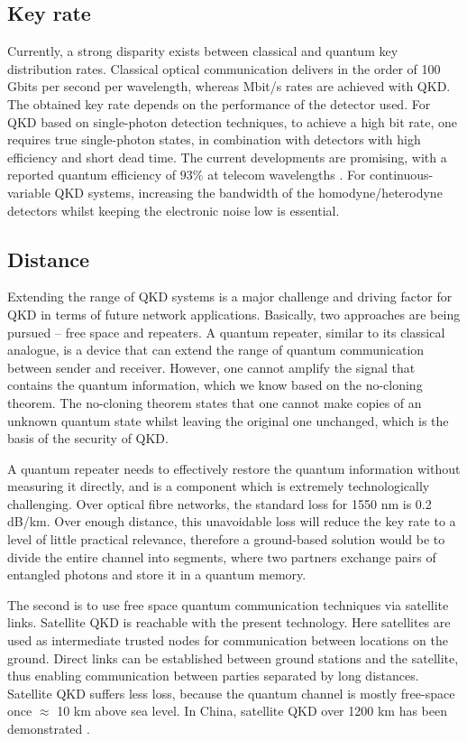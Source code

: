 \subsection{Key rate}
Currently, a strong disparity exists between classical and quantum key distribution rates. Classical optical communication delivers in the order of 100 Gbits per second per wavelength, whereas Mbit/s rates are achieved with QKD.
% 
 The obtained key rate depends on the performance of the detector used. For QKD based on single-photon detection techniques, to achieve a high bit rate, one requires true single-photon states, in combination with detectors with high efficiency and short dead time. The current developments are promising, with a reported quantum efficiency of $93\%$ at telecom wavelengths \cite{marsili2013detecting}.
% 
 For continuous-variable QKD systems, increasing the bandwidth of the homodyne/heterodyne detectors whilst keeping the electronic noise low is essential.

\subsection{Distance}
Extending the range of QKD systems is a major challenge and driving factor for QKD in terms of future network applications. Basically, two approaches are being pursued -- free space and repeaters.  A quantum repeater, similar
to its classical analogue, is a device that can extend the range of quantum communication between sender and receiver. However, one cannot amplify the signal that contains the quantum information, which we know based on the no-cloning theorem. The no-cloning theorem states that one cannot make copies of an unknown quantum state whilst leaving the original one unchanged, which is the basis of the security of QKD.

A quantum repeater needs to effectively restore the quantum information without measuring it directly, and is a component which is extremely technologically challenging. 
Over optical fibre networks, the standard loss for 1550 nm is 0.2 dB/km. Over enough distance, this unavoidable loss will reduce the key rate to a level of little practical relevance, therefore a ground-based solution would be to divide the entire channel into segments, where two partners exchange pairs of entangled photons and store it in a quantum memory\cite{PhysRevLett.81.5932,PhysRevA.59.169}.

The second is to use free space quantum communication techniques via satellite links. Satellite QKD is reachable with the present technology. Here satellites are used as intermediate trusted nodes for
communication between locations on the ground.
 Direct links can be
established between ground stations and the satellite, thus
enabling communication between parties separated by long distances. Satellite QKD suffers less loss, because the quantum channel is mostly free-space once $\approx$ 10 km above sea level.
% 
In China, satellite QKD over 1200 km has been demonstrated \cite{liao2017satellite}.


